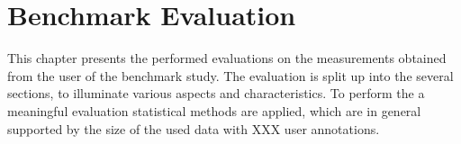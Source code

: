 
\chapter{Benchmark Evaluation}\label{ord:ch5}

This chapter presents the performed evaluations on the measurements obtained from the user of the benchmark study.
The evaluation is split up into the several sections, to illuminate various aspects and characteristics.
To perform the a meaningful evaluation statistical methods are applied, which are in general supported by the size of the used data with XXX user annotations.





